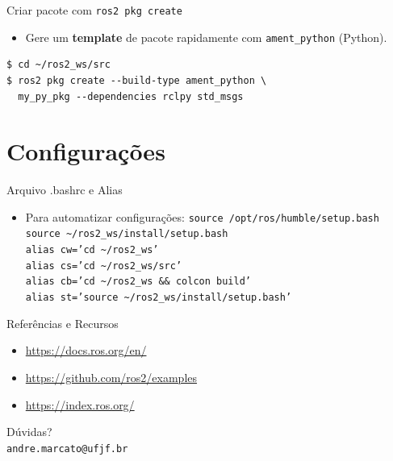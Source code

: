 \begin{frame}[fragile]{Criar pacote com \texttt{ros2 pkg create}}
  \begin{itemize}
    \item Gere um \textbf{template} de pacote rapidamente com \texttt{ament\_python} (Python).
  \end{itemize}

  \begin{lstlisting}[style=bashstyle]
$ cd ~/ros2_ws/src
$ ros2 pkg create --build-type ament_python \
  my_py_pkg --dependencies rclpy std_msgs
  \end{lstlisting}
\end{frame}



\section{Configurações}

\begin{frame}{Arquivo .bashrc e Alias}
\begin{itemize}
  \item Para automatizar configurações:
\texttt{source /opt/ros/humble/setup.bash}\\
\texttt{source \textasciitilde{}/ros2\_ws/install/setup.bash}\\
\texttt{alias cw='cd \textasciitilde{}/ros2\_ws'}\\
\texttt{alias cs='cd \textasciitilde{}/ros2\_ws/src'}\\
\texttt{alias cb='cd \textasciitilde{}/ros2\_ws \&\& colcon build'}\\
\texttt{alias st='source \textasciitilde{}/ros2\_ws/install/setup.bash'}
\end{itemize}
\end{frame}

\AtBeginSection[]{}

\begin{frame}{Referências e Recursos}
\begin{itemize}
  \item \url{https://docs.ros.org/en/}
  \item \url{https://github.com/ros2/examples}
  \item \url{https://index.ros.org/}
\end{itemize}
\end{frame}

\begin{frame}
\centering
\Large Dúvidas? \\
\bigskip
\small \texttt{andre.marcato@ufjf.br}
\end{frame}
